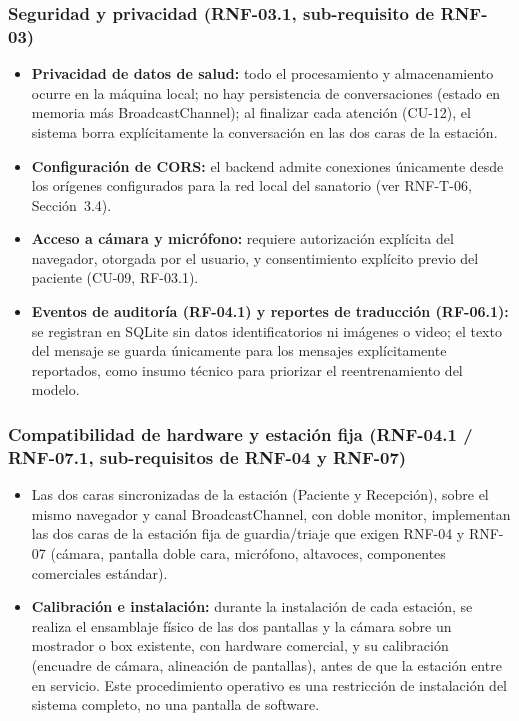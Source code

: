 \subsubsection{Seguridad y privacidad (RNF-03.1, sub-requisito de RNF-03)}
\begin{itemize}
    \item \textbf{Privacidad de datos de salud:} todo el procesamiento y almacenamiento ocurre en la máquina local; no hay persistencia de conversaciones (estado en memoria más BroadcastChannel); al finalizar cada atención (CU-12), el sistema borra explícitamente la conversación en las dos caras de la estación.
    \item \textbf{Configuración de CORS:} el backend admite conexiones únicamente desde los orígenes configurados para la red local del sanatorio (ver RNF-T-06, Sección~3.4).
    \item \textbf{Acceso a cámara y micrófono:} requiere autorización explícita del navegador, otorgada por el usuario, y consentimiento explícito previo del paciente (CU-09, RF-03.1).
    \item \textbf{Eventos de auditoría (RF-04.1) y reportes de traducción (RF-06.1):} se registran en SQLite sin datos identificatorios ni imágenes o video; el texto del mensaje se guarda únicamente para los mensajes explícitamente reportados, como insumo técnico para priorizar el reentrenamiento del modelo.
\end{itemize}

\subsubsection{Compatibilidad de hardware y estación fija (RNF-04.1 / RNF-07.1, sub-requisitos de RNF-04 y RNF-07)}
\begin{itemize}
    \item Las dos caras sincronizadas de la estación (Paciente y Recepción), sobre el mismo navegador y canal BroadcastChannel, con doble monitor, implementan las dos caras de la estación fija de guardia/triaje que exigen RNF-04 y RNF-07 (cámara, pantalla doble cara, micrófono, altavoces, componentes comerciales estándar).
    \item \textbf{Calibración e instalación:} durante la instalación de cada estación, se realiza el ensamblaje físico de las dos pantallas y la cámara sobre un mostrador o box existente, con hardware comercial, y su calibración (encuadre de cámara, alineación de pantallas), antes de que la estación entre en servicio. Este procedimiento operativo es una restricción de instalación del sistema completo, no una pantalla de software.
\end{itemize}


